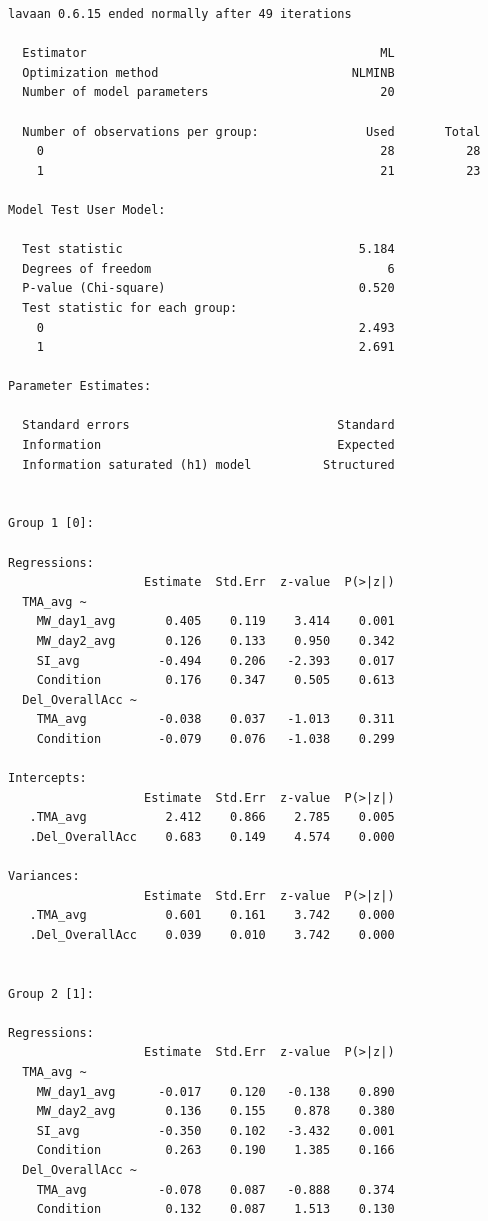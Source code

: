 \documentclass[
  letterpaper,
  DIV=11,
  numbers=noendperiod]{scrartcl}
\begin{document}
\begin{verbatim}
lavaan 0.6.15 ended normally after 49 iterations

  Estimator                                         ML
  Optimization method                           NLMINB
  Number of model parameters                        20

  Number of observations per group:               Used       Total
    0                                               28          28
    1                                               21          23

Model Test User Model:
                                                      
  Test statistic                                 5.184
  Degrees of freedom                                 6
  P-value (Chi-square)                           0.520
  Test statistic for each group:
    0                                            2.493
    1                                            2.691

Parameter Estimates:

  Standard errors                             Standard
  Information                                 Expected
  Information saturated (h1) model          Structured


Group 1 [0]:

Regressions:
                   Estimate  Std.Err  z-value  P(>|z|)
  TMA_avg ~                                           
    MW_day1_avg       0.405    0.119    3.414    0.001
    MW_day2_avg       0.126    0.133    0.950    0.342
    SI_avg           -0.494    0.206   -2.393    0.017
    Condition         0.176    0.347    0.505    0.613
  Del_OverallAcc ~                                    
    TMA_avg          -0.038    0.037   -1.013    0.311
    Condition        -0.079    0.076   -1.038    0.299

Intercepts:
                   Estimate  Std.Err  z-value  P(>|z|)
   .TMA_avg           2.412    0.866    2.785    0.005
   .Del_OverallAcc    0.683    0.149    4.574    0.000

Variances:
                   Estimate  Std.Err  z-value  P(>|z|)
   .TMA_avg           0.601    0.161    3.742    0.000
   .Del_OverallAcc    0.039    0.010    3.742    0.000


Group 2 [1]:

Regressions:
                   Estimate  Std.Err  z-value  P(>|z|)
  TMA_avg ~                                           
    MW_day1_avg      -0.017    0.120   -0.138    0.890
    MW_day2_avg       0.136    0.155    0.878    0.380
    SI_avg           -0.350    0.102   -3.432    0.001
    Condition         0.263    0.190    1.385    0.166
  Del_OverallAcc ~                                    
    TMA_avg          -0.078    0.087   -0.888    0.374
    Condition         0.132    0.087    1.513    0.130


\end{verbatim}
\end{document}
